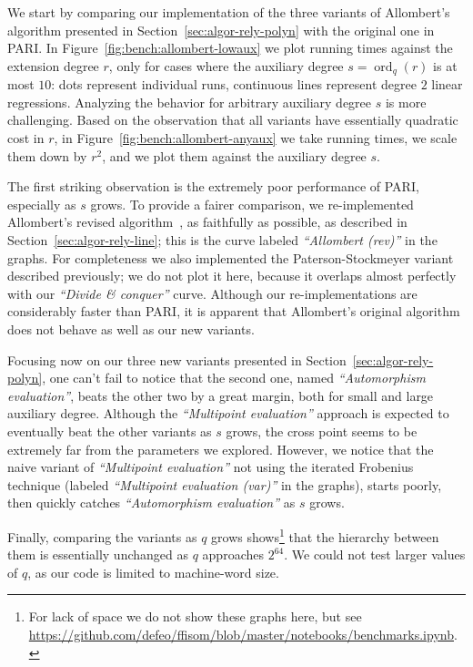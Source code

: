 \documentclass{mcom-l}
\theoremstyle{plain}
\theoremstyle{definition}
\DeclareMathOperator{\order}{ord} %
\newcounter{algorithm}
\begin{document}
We start by comparing our implementation of the three variants of
Allombert's algorithm presented in Section~\ref{sec:algor-rely-polyn}
with the original one in PARI. %
In Figure~\ref{fig:bench:allombert-lowaux} we plot running times
against the extension degree $r$, only for cases where the auxiliary
degree $s=\order_q(r)$ is at most $10$: dots represent individual
runs, continuous lines represent degree $2$ linear regressions. %
Analyzing the behavior for arbitrary auxiliary degree $s$ is more
challenging. %
Based on the observation that all variants have essentially quadratic
cost in $r$, in Figure~\ref{fig:bench:allombert-anyaux} we take
running times, we scale them down by $r^2$, and we plot them against
the auxiliary degree $s$. %

The first striking observation is the extremely poor performance of
PARI, especially as $s$ grows. %
To provide a fairer comparison, we re-implemented Allombert's revised
algorithm~\cite{Allombert02-rev}, as faithfully as possible, as
described in Section~\ref{sec:algor-rely-line}; this is the curve
labeled \emph{``Allombert (rev)''} in the graphs. %
For completeness we also implemented the Paterson-Stockmeyer variant
described previously; we do not plot it here, because it overlaps
almost perfectly with our \emph{``Divide \& conquer''} curve. %
Although our re-implementations are considerably faster than PARI, it
is apparent that Allombert's original algorithm does not behave as
well as our new variants.

Focusing now on our three new variants presented in
Section~\ref{sec:algor-rely-polyn}, one can't fail to notice that the
second one, named \emph{``Automorphism evaluation''}, beats the other
two by a great margin, both for small and large auxiliary degree. %
Although the \emph{``Multipoint evaluation''} approach is expected to
eventually beat the other variants as $s$ grows, the cross point seems
to be extremely far from the parameters we explored. %
However, we notice that the naive variant of \emph{``Multipoint
  evaluation''} not using the iterated Frobenius technique (labeled
\emph{``Multipoint evaluation (var)''} in the graphs), starts poorly,
then quickly catches \emph{``Automorphism evaluation''} as $s$ grows.

Finally, comparing the variants as $q$ grows shows\footnote{For lack
  of space we do not show these graphs here, but see
  \url{https://github.com/defeo/ffisom/blob/master/notebooks/benchmarks.ipynb}.}
that the hierarchy between them is essentially unchanged as $q$
approaches $2^{64}$. %
We could not test larger values of $q$, as our code is limited to
machine-word size.
\end{document}
